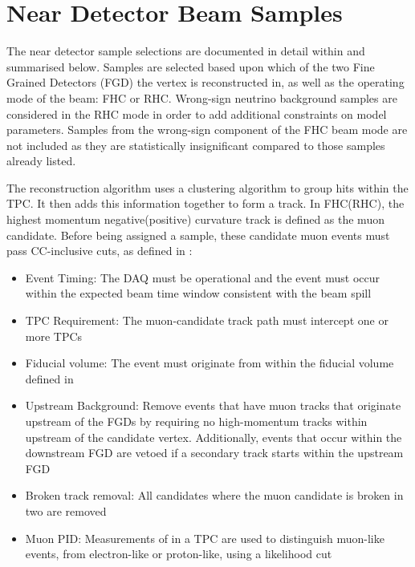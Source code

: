 \clearpage
\section{Near Detector Beam Samples}
\label{sec:SelsAndSysts_Sels_ND}

The near detector sample selections are documented in detail within \cite{t2k_tn_395} and summarised below. Samples are selected based upon which of the two Fine Grained Detectors (FGD) the vertex is reconstructed in, as well as the operating mode of the beam: FHC or RHC. Wrong-sign neutrino background samples are considered in the RHC mode in order to add additional constraints on model parameters. Samples from the wrong-sign component of the FHC beam mode are not included as they are statistically insignificant compared to those samples already listed.

The reconstruction algorithm uses a clustering algorithm to group hits within the TPC. It then adds this information together to form a track. In FHC(RHC), the highest momentum negative(positive) curvature track is defined as the muon candidate. Before being assigned a sample, these candidate muon events must pass CC-inclusive cuts, as defined in \cite{t2k_tn_212}:

\begin{itemize}
\item Event Timing: The DAQ must be operational and the event must occur within the expected beam time window consistent with the beam spill
\item TPC Requirement: The muon-candidate track path must intercept one or more TPCs
\item Fiducial volume: The event must originate from within the fiducial volume defined in \cite{thesis_will}
\item Upstream Background: Remove events that have muon tracks that originate upstream of the FGDs by requiring no high-momentum tracks within  upstream of the candidate vertex. Additionally, events that occur within the downstream FGD are vetoed if a secondary track starts within the upstream FGD
\item Broken track removal: All candidates where the muon candidate is broken in two are removed
\item Muon PID: Measurements of  in a TPC are used to distinguish muon-like events, from electron-like or proton-like, using a likelihood cut
\end{itemize}


